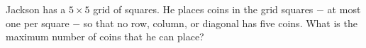 Jackson has a $5\times 5$ grid of squares. He places coins in the grid squares $-$ at most one per square $-$ so that no row, column, or diagonal has five coins. What is the maximum number of coins that he can place?